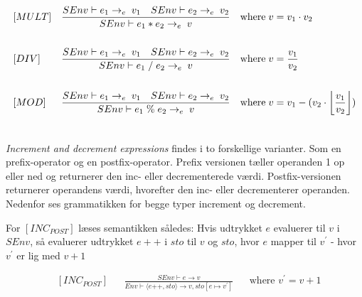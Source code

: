 \begin{align*}
&[MULT] & &\frac{SEnv \vdash e_1 \rightarrow_e\; v_1\quad SEnv \vdash e_2 \rightarrow_e\; v_2}{SEnv \vdash e_1 * e_2 \rightarrow_e\; v} & &\text{where}\; v = v_1 \cdot v_2\\\\
&[DIV] & &\frac{SEnv \vdash e_1 \rightarrow_e\; v_1\quad SEnv \vdash e_2 \rightarrow_e\; v_2}{SEnv \vdash e_1\; /\; e_2 \rightarrow_e\; v} & &\text{where}\; v = \frac{v_1}{v_2}\\\\
&[MOD] & &\frac{SEnv \vdash e_1 \rightarrow_e\; v_1\quad SEnv \vdash e_2 \rightarrow_e\; v_2}{SEnv \vdash e_1\; \%\; e_2 \rightarrow_e\; v} & &\text{where}\; v = v_1 - (v_2 \cdot \floor*{\frac{v_1}{v_2}})\\\\
\end{align*}


\textit{Increment and decrement expressions} findes i to forskellige varianter. Som en prefix-operator og en postfix-operator. Prefix versionen tæller operanden 1 op eller ned og returnerer den inc- eller decrementerede værdi. Postfix-versionen returnerer operandens værdi, hvorefter den inc- eller decrementerer operanden. Nedenfor ses grammatikken for begge typer increment og decrement.

For $[INC_{POST}]$ læses semantikken således: Hvis udtrykket $e$ evaluerer til $v$ i $SEnv$, så evaluerer udtrykket $e++$ i $sto$ til $v$ og $sto$, hvor $e$ mapper til $v^\prime$ - hvor $v^\prime$ er lig med $v+1$ 

\begin{align*}
&[INC_{POST}] & &\frac{SEnv \vdash e \rightarrow v}{Env \vdash \langle e\text{++}, sto \rangle \rightarrow  v, sto[e \mapsto v^\prime] } & &\text{where }v^\prime = v + 1\\\\
\end{align*}